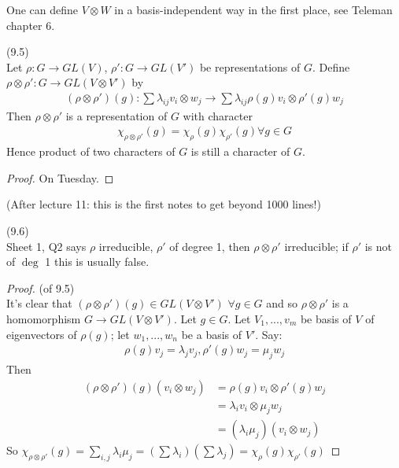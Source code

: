 \documentclass[a4paper]{article}
\begin{document}
\begin{rem}
One can define $V \otimes W$ in a basis-independent way in the first place, see Teleman chapter 6.
\end{rem}

\begin{prop} (9.5)\\
Let $\rho: G \to GL(V)$, $\rho': G \to GL(V')$ be representations of $G$. Define $\rho \otimes \rho': G \to GL(V \otimes V')$ by
\begin{equation*}
\begin{aligned}
(\rho \otimes \rho') (g) : \sum \lambda_{ij} v_i \otimes w_j \to \sum \lambda_{ij} \rho(g) v_i \otimes \rho'(g) w_j
\end{aligned}
\end{equation*}
Then $\rho \otimes \rho'$ is a representation of $G$ with character
\begin{equation*}
\begin{aligned}
\chi_{\rho \otimes \rho'} (g) = \chi_\rho(g) \chi_{\rho'} (g) \forall g \in G
\end{aligned}
\end{equation*}
Hence product of two characters of $G$ is still a character of $G$.
\begin{proof}
On Tuesday.
\end{proof}
\end{prop}

(After lecture 11: this is the first notes to get beyond 1000 lines!)

\begin{rem} (9.6)\\
Sheet 1, Q2 says $\rho$ irreducible, $\rho'$ of degree 1, then $\rho \otimes \rho'$ irreducible; if $\rho'$ is not of $\deg$ 1 this is usually false.
\end{rem}

\begin{proof} (of 9.5)\\
It's clear that $(\rho \otimes \rho') (g) \in GL(V \otimes V')$ $\forall g \in G$ and so $\rho \otimes \rho'$ is a homomorphism $G \to GL(V \otimes V')$. Let $g \in G$. Let $V_1,...,v_m$ be basis of $V$ of eigenvectors of $\rho(g)$; let $w_1,...,w_n$ be a basis of $V'$. Say: 
\begin{equation*}
\begin{aligned}
\rho(g) v_j = \lambda_j v_j, \rho'(g) w_j = \mu_j w_j
\end{aligned}
\end{equation*}
Then 
\begin{equation*}
\begin{aligned}
(\rho \otimes \rho') (g) (v_i \otimes w_j) &= \rho(g) v_i \otimes \rho'(g) w_j\\
&= \lambda_i v_i \otimes \mu_j w_j\\
&= (\lambda_i \mu_j) (v_i \otimes w_j)
\end{aligned}
\end{equation*}
So $\chi_{\rho \otimes \rho'}(g) = \sum_{i,j} \lambda_i \mu_j = (\sum \lambda_i)(\sum\lambda_j) = \chi_\rho(g)\chi_{\rho'}(g)$
\end{proof}
\end{document}
